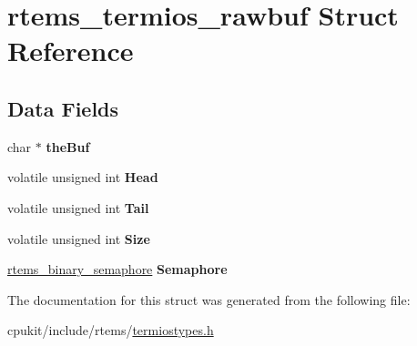 \hypertarget{structrtems__termios__rawbuf}{}\section{rtems\+\_\+termios\+\_\+rawbuf Struct Reference}
\label{structrtems__termios__rawbuf}
\subsection*{Data Fields}
\begin{DoxyCompactItemize}
\item 
\mbox{\label{structrtems__termios__rawbuf_a3d5c18bc1415c2ae2ca9dcbaac2d4337}} 
char $\ast$ {\bfseries the\+Buf}
\item 
\mbox{\label{structrtems__termios__rawbuf_adbd971b596353d84546bb0b811df7743}} 
volatile unsigned int {\bfseries Head}
\item 
\mbox{\label{structrtems__termios__rawbuf_aa31a55b97841a83a0991ec7fdc9f26bc}} 
volatile unsigned int {\bfseries Tail}
\item 
\mbox{\label{structrtems__termios__rawbuf_a614b9538054c08d0814a58c45bc238a9}} 
volatile unsigned int {\bfseries Size}
\item 
\mbox{\label{structrtems__termios__rawbuf_a6954dd2334597e06c388c47b6df137c7}} 
\mbox{\hyperlink{structrtems__binary__semaphore}{rtems\+\_\+binary\+\_\+semaphore}} {\bfseries Semaphore}
\end{DoxyCompactItemize}


The documentation for this struct was generated from the following file\+:\begin{DoxyCompactItemize}
\item 
cpukit/include/rtems/\mbox{\hyperlink{termiostypes_8h}{termiostypes.\+h}}\end{DoxyCompactItemize}
